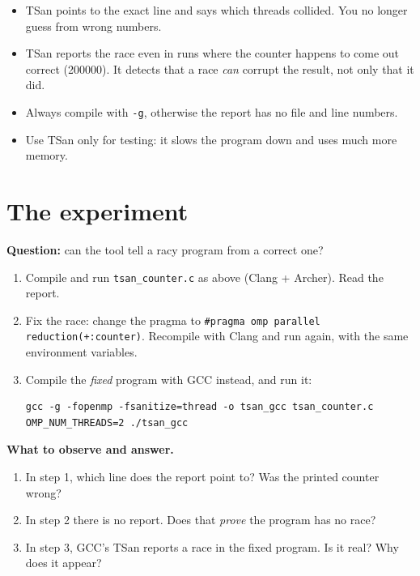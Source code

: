 \documentclass[11pt,a4paper]{article}
\begin{document}
\begin{keyidea}
\begin{itemize}
  \item TSan points to the exact line and says which threads collided. You no longer guess
        from wrong numbers.
  \item TSan reports the race even in runs where the counter happens to come out
        correct (200000). It detects that a race \emph{can} corrupt the result, not only
        that it did.
  \item Always compile with \texttt{-g}, otherwise the report has no file and line numbers.
  \item Use TSan only for testing: it slows the program down and uses much more memory.
\end{itemize}
\end{keyidea}

\section{The experiment}
\begin{experiment}
\textbf{Question:} can the tool tell a racy program from a correct one?
\begin{enumerate}
  \item Compile and run \texttt{tsan\_counter.c} as above (Clang + Archer). Read the report.
  \item Fix the race: change the pragma to
        \texttt{\#pragma omp parallel reduction(+:counter)}. Recompile with Clang and run
        again, with the same environment variables.
  \item Compile the \emph{fixed} program with GCC instead, and run it:
\begin{lstlisting}[style=sh]
gcc -g -fopenmp -fsanitize=thread -o tsan_gcc tsan_counter.c
OMP_NUM_THREADS=2 ./tsan_gcc
\end{lstlisting}
\end{enumerate}
\textbf{What to observe and answer.}
\begin{enumerate}
  \item In step 1, which line does the report point to? Was the printed counter wrong?
  \item In step 2 there is no report. Does that \emph{prove} the program has no race?
  \item In step 3, GCC's TSan reports a race in the fixed program. Is it real? Why does it
        appear?
\end{enumerate}
\end{experiment}
\end{document}
